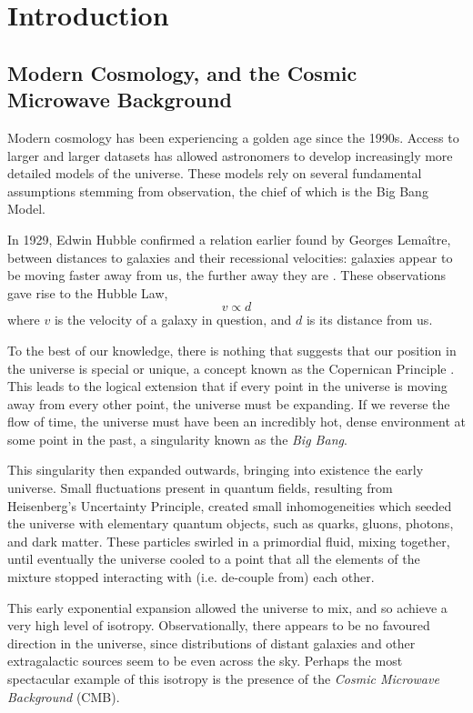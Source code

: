 \chapter{Introduction}
\section{Modern Cosmology, and the Cosmic Microwave Background}
Modern cosmology has been experiencing a golden age since the 1990s. Access to larger and larger datasets has allowed astronomers to develop increasingly more detailed models of the universe. These models rely on several fundamental assumptions stemming from observation, the chief of which is the Big Bang Model. 
\par In 1929, Edwin Hubble confirmed a relation earlier found by Georges Lemaître, between  distances to galaxies and their recessional velocities: galaxies appear to be moving faster away from us, the further away they are \citep{1929PNAS...15..168H}. These observations gave rise to the Hubble Law,
\begin{equation}
	v  \varpropto d
	\label{eq:HubbleLaw}
\end{equation}
where $v$ is the velocity of a galaxy in question, and $d$ is its distance from us. 
\par To the best of our knowledge, there is nothing that suggests that our position in the universe is special or unique, a concept known as the Copernican Principle \citep{peacock_peacock_1998}. This leads to the logical extension that if every point in the universe is moving away from every other point, the universe must be expanding. If we reverse the flow of time, the universe must have been an incredibly hot, dense environment at some point in the past, a singularity known as the \emph{Big Bang}.
\par This singularity then expanded outwards, bringing into existence the early universe. Small fluctuations present in quantum fields, resulting from Heisenberg's Uncertainty Principle, created small inhomogeneities which seeded the universe with elementary quantum objects, such as quarks, gluons, photons, and dark matter. These particles swirled in a primordial fluid, mixing together, until eventually the universe cooled to a point that all the elements of the mixture stopped interacting with (i.e. de-couple from) each other. 
\par This early exponential expansion allowed the universe to mix, and so achieve a very high level of isotropy. Observationally, there appears to be no favoured direction in the universe, since distributions of distant galaxies and other extragalactic sources seem to be even across the sky. Perhaps the most spectacular example of this isotropy is the presence of the \emph{Cosmic Microwave Background} (CMB).
